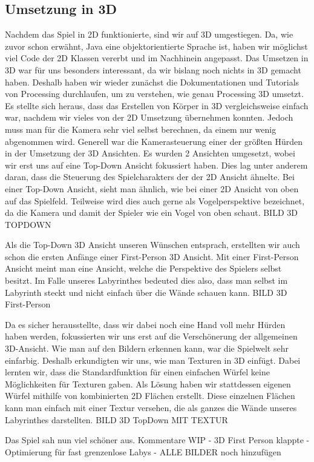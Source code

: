 \subsection{Umsetzung in 3D}\label{subsec:umsetzung-in-3D}
Nachdem das Spiel in 2D funktionierte, sind wir auf 3D umgestiegen. Da, wie zuvor schon erwähnt, Java eine objektorientierte Sprache ist, haben wir möglichst viel Code der 2D Klassen vererbt und im Nachhinein angepasst. 
Das Umsetzen in 3D war für uns besonders interessant, da wir bislang noch nichts in 3D gemacht haben. Deshalb haben wir wieder zunächst die Dokumentationen und Tutorials von Processing durchlaufen, um zu verstehen, wie genau Processing 3D umsetzt. Es stellte sich heraus, dass das Erstellen von Körper in 3D vergleichsweise einfach war, nachdem wir vieles von der 2D Umsetzung übernehmen konnten. Jedoch muss man für die Kamera sehr viel selbst berechnen, da einem nur wenig abgenommen wird. Generell war die Kamerasteuerung einer der größten Hürden in der Umsetzung der 3D Ansichten.
Es wurden 2 Ansichten umgesetzt, wobei wir erst uns auf eine Top-Down Ansicht fokussiert haben. Dies lag unter anderem daran, dass die Steuerung des Spielcharakters der der 2D Ansicht ähnelte. Bei einer Top-Down Ansicht, sieht man ähnlich, wie bei einer 2D Ansicht von oben auf das Spielfeld. Teilweise wird dies auch gerne als Vogelperspektive bezeichnet, da die Kamera und damit der Spieler wie ein Vogel von oben schaut. 
\newline BILD 3D TOPDOWN \newline

Als die Top-Down 3D Ansicht unseren Wünschen entsprach, erstellten wir auch schon die ersten Anfänge einer First-Person 3D Ansicht. Mit einer First-Person Ansicht meint man eine Ansicht, welche die Perspektive des Spielers selbst besitzt. Im Falle unseres Labyrinthes bedeuted dies also, dass man selbst im Labyrinth steckt und nicht einfach über die Wände schauen kann. 
\newline BILD 3D First-Person \newline

Da es sicher herausstellte, dass wir dabei noch eine Hand voll mehr Hürden haben werden, fokussierten wir uns erst auf die Verschönerung der allgemeinen 3D-Ansicht. Wie man auf den Bildern erkennen kann, war die Spielwelt sehr einfarbig. Deshalb erkundigten wir uns, wie man Texturen in 3D einfügt. Dabei lernten wir, dass die Standardfunktion für einen einfachen Würfel keine Möglichkeiten für Texturen gaben. Als Lösung haben wir stattdessen eigenen Würfel mithilfe von kombinierten 2D Flächen erstellt. Diese einzelnen Flächen kann man einfach mit einer Textur versehen, die als ganzes die Wände unseres Labyrinthes darstellten.
\newline BILD 3D TopDown MIT TEXTUR \newline

Das Spiel sah nun viel schöner aus. \newline
Kommentare WIP \newline
- 3D First Person klappte\newline
- Optimierung für fast grenzenlose Labys \newline
- ALLE BILDER noch hinzufügen \newline